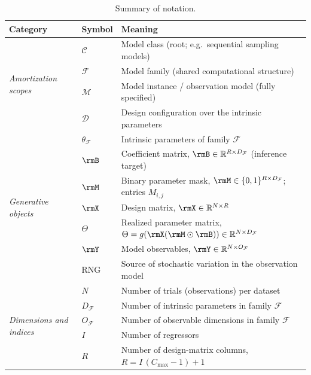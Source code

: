 \begin{table}[t]
\centering
\caption{Summary of notation.}
\label{tab:notation}
\renewcommand{\arraystretch}{1.2}
\begin{tabularx}{\linewidth}{@{}p{2.4cm} l >{\raggedright\arraybackslash}X@{}}
\toprule
Category & Symbol & Meaning \\
\midrule
\multirow{4}{=}{\textit{Amortization scopes}}
 & $\mathcal{C}$ & Model class (root; e.g.\ sequential sampling models) \\
 & $\mathcal{F}$ & Model family (shared computational structure) \\
 & $\mathcal{M}$ & Model instance / observation model (fully specified) \\
 & $\mathcal{D}$ & Design configuration over the intrinsic parameters \\
\midrule
\multirow{7}{=}{\textit{Generative objects}}
 & $\theta_{\mathcal{F}}$ & Intrinsic parameters of family $\mathcal{F}$ \\
 & $\rmB$ & Coefficient matrix, $\rmB \in \mathbb{R}^{R \times D_{\mathcal{F}}}$ (inference target) \\
 & $\rmM$ & Binary parameter mask, $\rmM \in \{0,1\}^{R \times D_{\mathcal{F}}}$; entries $M_{i,j}$ \\
 & $\rmX$ & Design matrix, $\rmX \in \mathbb{R}^{N \times R}$ \\
 & $\Theta$ & Realized parameter matrix, $\Theta = g(\rmX(\rmM \odot \rmB)) \in \mathbb{R}^{N \times D_{\mathcal{F}}}$ \\
 & $\rmY$ & Model observables, $\rmY \in \mathbb{R}^{N \times O_{\mathcal{F}}}$ \\
 & $\mathrm{RNG}$ & Source of stochastic variation in the observation model \\
\midrule
\multirow{8}{=}{\textit{Dimensions and indices}}
 & $N$ & Number of trials (observations) per dataset \\
 & $D_{\mathcal{F}}$ & Number of intrinsic parameters in family $\mathcal{F}$ \\
 & $O_{\mathcal{F}}$ & Number of observable dimensions in family $\mathcal{F}$ \\
 & $I$ & Number of regressors \\
 & $R$ & Number of design-matrix columns, $R = I\,(C_{\mathrm{max}}-1)+1$ \\

\end{tabularx}
\end{table}
